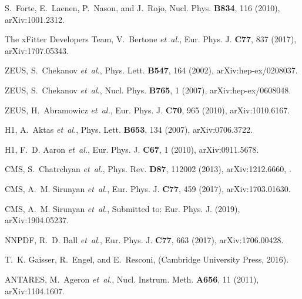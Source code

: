 \documentclass[a4paper,11pt]{article}
\begin{document}
\begin{thebibliography}{99}
S.~Forte, E.~Laenen, P.~Nason, and J.~Rojo,
\newblock Nucl. Phys. {\bf B834}, 116 (2010), arXiv:1001.2312.

The xFitter Developers Team, V.~Bertone {\em et~al.},
\newblock Eur. Phys. J. {\bf C77}, 837 (2017), arXiv:1707.05343.

ZEUS, S.~Chekanov {\em et~al.},
\newblock Phys. Lett. {\bf B547}, 164 (2002), arXiv:hep-ex/0208037.

ZEUS, S.~Chekanov {\em et~al.},
\newblock Nucl. Phys. {\bf B765}, 1 (2007), arXiv:hep-ex/0608048.

ZEUS, H.~Abramowicz {\em et~al.},
\newblock Eur. Phys. J. {\bf C70}, 965 (2010), arXiv:1010.6167.

H1, A.~Aktas {\em et~al.},
\newblock Phys. Lett. {\bf B653}, 134 (2007), arXiv:0706.3722.

H1, F.~D. Aaron {\em et~al.},
\newblock Eur. Phys. J. {\bf C67}, 1 (2010), arXiv:0911.5678.

CMS, S.~Chatrchyan {\em et~al.},
\newblock Phys. Rev. {\bf D87}, 112002 (2013), arXiv:1212.6660,
.

CMS, A.~M. Sirunyan {\em et~al.},
\newblock Eur. Phys. J. {\bf C77}, 459 (2017), arXiv:1703.01630.

CMS, A.~M. Sirunyan {\em et~al.},
\newblock Submitted to: Eur. Phys. J.  (2019), arXiv:1904.05237.

NNPDF, R.~D. Ball {\em et~al.},
\newblock Eur. Phys. J. {\bf C77}, 663 (2017), arXiv:1706.00428.

T.~K. Gaisser, R.~Engel, and E.~Resconi,
 (Cambridge University Press,
  2016).

ANTARES, M.~Ageron {\em et~al.},
\newblock Nucl. Instrum. Meth. {\bf A656}, 11 (2011), arXiv:1104.1607.


\end{thebibliography}
\end{document}
